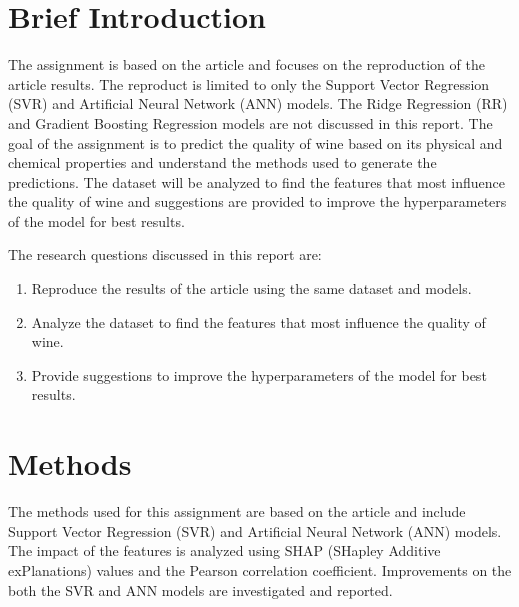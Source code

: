 \documentclass{article}
\begin{document}

\section{Brief Introduction}
The assignment is based on the article \cite{dahal2021prediction} and focuses on the reproduction of the article results.
The reproduct is limited to only the Support Vector Regression (SVR) and Artificial Neural Network (ANN) models.
The Ridge Regression (RR) and Gradient Boosting Regression models are not discussed in this report.
The goal of the assignment is to predict the quality of wine based on its physical and chemical properties and understand the methods used to generate the predictions.
The dataset will be analyzed to find the features that most influence the quality of wine and suggestions are provided to improve the hyperparameters of the model for best results.

The research questions discussed in this report are:
\begin{enumerate}
    \item Reproduce the results of the article \cite{dahal2021prediction} using the same dataset and models.
    \item Analyze the dataset to find the features that most influence the quality of wine.
    \item Provide suggestions to improve the hyperparameters of the model for best results.
\end{enumerate}

\section{Methods}
The methods used for this assignment are based on the article \cite{dahal2021prediction} and include Support Vector Regression (SVR) and Artificial Neural Network (ANN) models.
The impact of the features is analyzed using SHAP (SHapley Additive exPlanations) values and the Pearson correlation coefficient. Improvements on the both the SVR and ANN models are investigated and reported.
\end{document}
